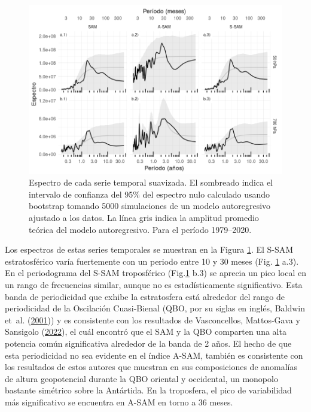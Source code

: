 \documentclass[12pt,oneside,a4paper]{reedthesis}
\begin{document}
\begin{figure}

{\centering \includegraphics{figures/30-sam/spectrum-1} 

}

\caption{Espectro de cada serie temporal suavizada. El sombreado indica el intervalo de confianza del 95\% del espectro nulo calculado usando bootstrap tomando 5000 simulaciones de un modelo autoregresivo ajustado a los datos. La línea gris indica la amplitud promedio teórica del modelo autoregresivo. Para el período 1979--2020.}\label{fig:spectrum}
\end{figure}

Los espectros de estas series temporales se muestran en la Figura \ref{fig:spectrum}.
El S-SAM estratosférico varía fuertemente con un periodo entre 10 y 30 meses (Fig. \ref{fig:spectrum} a.3).
En el periodograma del S-SAM troposférico (Fig.\ref{fig:spectrum} b.3) se aprecia un pico local en un rango de frecuencias similar, aunque no es estadísticamente significativo.
Esta banda de periodicidad que exhibe la estratosfera está alrededor del rango de periodicidad de la Oscilación Cuasi-Bienal (QBO, por su siglas en inglés, Baldwin et~al. (\protect\hyperlink{ref-baldwin2001b}{2001})) y es consistente con los resultados de Vasconcellos, Mattos-Gava y Sansigolo (\protect\hyperlink{ref-vasconcellos2022}{2022}), el cuál encontró que el SAM y la QBO comparten una alta potencia común significativa alrededor de la banda de 2 años.
El hecho de que esta periodicidad no sea evidente en el índice A-SAM, también es consistente con los resultados de estos autores que muestran en sus composiciones de anomalías de altura geopotencial durante la QBO oriental y occidental, un monopolo bastante simétrico sobre la Antártida.
En la troposfera, el pico de variabilidad más significativo se encuentra en A-SAM en torno a 36 meses.
\end{document}
